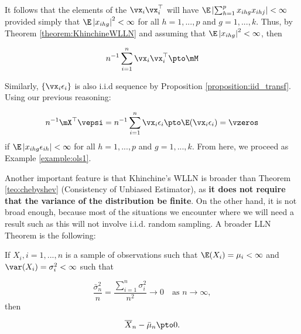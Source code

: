 \documentclass[english,12pt]{book}\usepackage[]{graphicx}\usepackage[]{xcolor}
\begin{document}
\begin{example}
It follows that the elements of the $\vx_i\vx_i^\top$ will have $\E\left|\sum_{h = 1}^p x_{ihg}x_{ihj}\right| < \infty$ provided simply that $\E\left|x_{ihg}\right|^2 < \infty$ for all $h = 1, ..., p$ and $g = 1, ..., k$.  Thus, by Theorem \ref{theorem:KhinchineWLLN} and assuming that $\E\left|x_{ihg}\right|^2 < \infty$, then 

\begin{equation}
  n^{-1}\sum_{i = 1}^n \vx_i\vx_i^\top\pto \mM
\end{equation}

Similarly, $\left\lbrace \vx_i\epsilon_i\right\rbrace$ is also i.i.d sequence by Proposition \ref{proposition:iid_transf}. Using our previous reasoning:

\begin{equation}
  n^{-1}\mX^\top\vepsi = n^{-1}\sum_{i = 1}^n \vx_i\epsilon_i \pto \E(\vx_i\epsilon_i) = \vzeros
\end{equation}
%
if  $\E\left|x_{ihg}\epsilon_{ih}\right| < \infty$ for all $h = 1, ..., p$ and $g = 1, ..., k$. From here, we proceed as Example \ref{example:ols1}.

\end{example}


Another important feature is that Khinchine's WLLN  is broader than Theorem \ref{teo:chebyshev} (Consistency of Unbiased Estimator), as \textbf{it does not require that the variance of the distribution be finite}. On the other hand, it is not broad enough, because most of the situations we encounter where we will need a result such as this will not involve i.i.d. random sampling. A broader LLN Theorem is the following:

\begin{theorem}\label{theorem:ChebychevWLLN}
  If $X_i, i = 1,...,n$ is a sample of observations such that $\E(X_i) = \mu_i <\infty$ and $\var(X_i)=\sigma^2_i < \infty$ such that
  
\begin{equation*}
  \frac{\bar{\sigma}^2_n}{n} = \frac{\sum_{i = 1}^n\sigma_i^2}{n^2}\to 0\quad \mbox{as $n\to\infty$},
\end{equation*}
%
then

\begin{equation*}
  \overline{X}_n - \bar{\mu}_n \pto 0.
\end{equation*}
\end{theorem}
\end{document}
